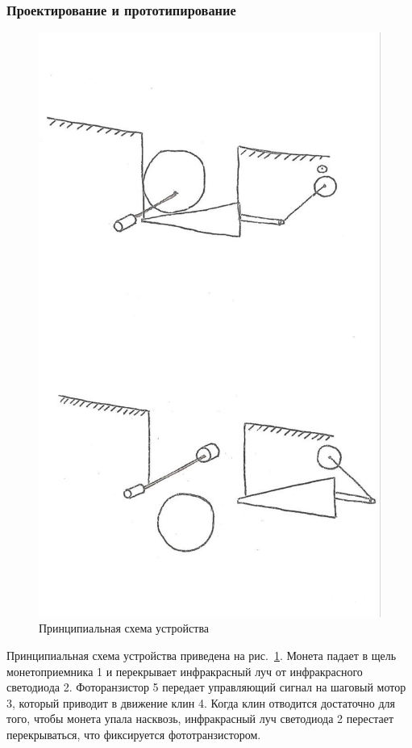 \subsubsection{Проектирование и прототипирование}

\begin{figure}[H]
	\centering
	\includegraphics[width=12cm]{scheme_idea.jpg}
	\caption{Принципиальная схема устройства}
	\label{ris:scheme_idea}
\end{figure}
\par\medskip

Принципиальная схема устройства приведена на рис.~\ref{ris:scheme_idea}. Монета падает в щель монетоприемника 1 и перекрывает инфракрасный луч от инфракрасного светодиода 2. Фоторанзистор 5 передает управляющий сигнал на шаговый мотор 3, который приводит в движение клин 4. Когда клин отводится достаточно для того, чтобы монета упала насквозь, инфракрасный луч светодиода 2 перестает перекрываться, что фиксируется фототранзистором. 



